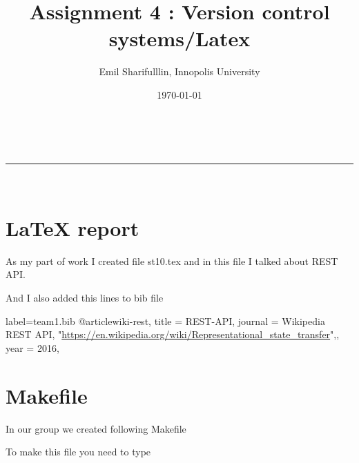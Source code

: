 \documentclass[a4paper,11pt]{article}
\makeatletter
\newcommand*{\TitleFont}{%
      \usefont{\encodingdefault}{\rmdefault}{b}{n}%
      \fontsize{16}{20}%
      \selectfont}
\renewcommand{\maketitle}{
\begin{center}
\vspace{2ex}
{\huge \textsc{\@title}}
\vspace{1ex}
\\
\rule{\linewidth}{0.5pt}\\
\@author \hfill \@date
\vspace{4ex}
\end{center}
}
\makeatother
\begin{document}







\title{ \TitleFont Assignment 4 : Version control systems/Latex }

\author{Emil Sharifulllin, Innopolis University}

\date{\today}

\maketitle

\tableofcontents

\section{LaTeX report}
As my part of work I created file st10.tex and in this file I talked about REST API.


And I also added this lines to bib file

\begin{bashcode*}{label=team1.bib}
@article{wiki-rest,
title = {REST-API},
journal = {Wikipedia REST API, "\url{https://en.wikipedia.org/wiki/Representational_state_transfer}",},
year = 2016,
}
\end{bashcode*}

\section{Makefile}

In our group we created following Makefile

To make this file you need to type
\end{document}
